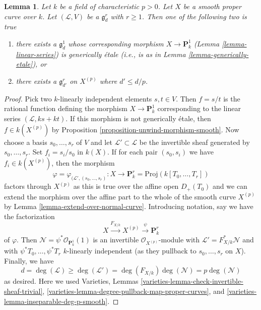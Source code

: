 \documentclass[10pt,a4paper]{amsart}
\theoremstyle{plain}
\newtheorem{lemma}[subsection]{Lemma}
\theoremstyle{definition}
\theoremstyle{remark}
\numberwithin{equation}{subsection}
\begin{document}
\begin{lemma}
\label{lemma-inseparable-linear-system}
Let $k$ be a field of characteristic $p > 0$. Let $X$ be a smooth proper
curve over $k$. Let $(\mathcal{L}, V)$ be a $\mathfrak g^r_d$ with $r \geq 1$.
Then one of the following two is true
\begin{enumerate}
\item there exists a $\mathfrak g^1_d$ whose corresponding morphism
$X \to \mathbf{P}^1_k$ (Lemma \ref{lemma-linear-series})
is generically \'etale (i.e., is as in Lemma \ref{lemma-generically-etale}), or
\item there exists a $\mathfrak g^r_{d'}$ on $X^{(p)}$ where
$d' \leq d/p$.
\end{enumerate}
\end{lemma}

\begin{proof}
Pick two $k$-linearly independent elements $s, t \in V$.
Then $f = s/t$ is the rational function defining the morphism
$X \to \mathbf{P}^1_k$ corresponding to the linear series
$(\mathcal{L}, ks + kt)$. If this morphism is not
generically \'etale, then $f \in k(X^{(p)})$ by
Proposition \ref{proposition-unwind-morphism-smooth}.
Now choose a basis $s_0, \ldots, s_r$ of $V$ and let
$\mathcal{L}' \subset \mathcal{L}$ be the invertible sheaf
generated by $s_0, \ldots, s_r$. Set $f_i = s_i/s_0$ in $k(X)$.
If for each pair $(s_0, s_i)$ we have $f_i \in k(X^{(p)})$, then
the morphism
$$
\varphi = \varphi_{(\mathcal{L}', (s_0, \ldots, s_r)} :
X
\longrightarrow
\mathbf{P}^r_k = \text{Proj}(k[T_0, \ldots, T_r])
$$
factors through $X^{(p)}$ as this is true over the affine open
$D_+(T_0)$ and we can extend the morphism over the affine part
to the whole of the smooth curve $X^{(p)}$ by
Lemma \ref{lemma-extend-over-normal-curve}.
Introducing notation, say we have the factorization
$$
X \xrightarrow{F_{X/k}} X^{(p)} \xrightarrow{\psi} \mathbf{P}^r_k
$$
of $\varphi$. Then $\mathcal{N} = \psi^*\mathcal{O}_{\mathbf{P}^1_k}(1)$
is an invertible $\mathcal{O}_{X^{(p)}}$-module with
$\mathcal{L}' = F_{X/k}^*\mathcal{N}$ and with
$\psi^*T_0, \ldots, \psi^*T_r$ $k$-linearly independent
(as they pullback to $s_0, \ldots, s_r$ on $X$).
Finally, we have
$$
d = \deg(\mathcal{L}) \geq \deg(\mathcal{L}') =
\deg(F_{X/k}) \deg(\mathcal{N}) = p \deg(\mathcal{N})
$$
as desired. Here we used Varieties, Lemmas
\ref{varieties-lemma-check-invertible-sheaf-trivial},
\ref{varieties-lemma-degree-pullback-map-proper-curves}, and
\ref{varieties-lemma-inseparable-deg-p-smooth}.
\end{proof}
\end{document}
